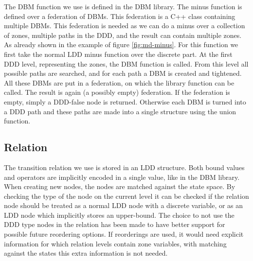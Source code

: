 The DBM function we use is defined in the \uppaal{} DBM library. The minus function is defined over a federation of DBMs. This federation is a C++ class containing multiple DBMs. This federation is needed as we can do a minus over a collection of zones, multiple paths in the DDD, and the result can contain multiple zones. As already shown in the example of figure \ref{fig:md-minus}. For this function we first take the normal LDD minus function over the discrete part. At the first DDD level, representing the zones, the DBM function is called. From this level all possible paths are searched, and for each path a DBM is created and tightened. All these DBMs are put in a federation, on which the library function can be called. The result is again (a possibly empty) federation. If the federation is empty, simply a DDD-false node is returned. Otherwise each DBM is turned into a DDD path and these paths are made into a single structure using the union function.

\subsection{Relation}
The transition relation we use is stored in an LDD structure. Both bound values and operators are implicitly encoded in a single value, like in the DBM library. When creating new nodes, the nodes are matched against the state space. By checking the type of the node on the current level it can be checked if the relation node should be treated as a normal LDD node with a discrete variable, or as an LDD node which implicitly stores an upper-bound. The choice to not use the DDD type nodes in the relation has been made to have better support for possible future reordering options. If reorderings are used, it would need explicit information for which relation levels contain zone variables, with matching against the states this extra information is not needed.


